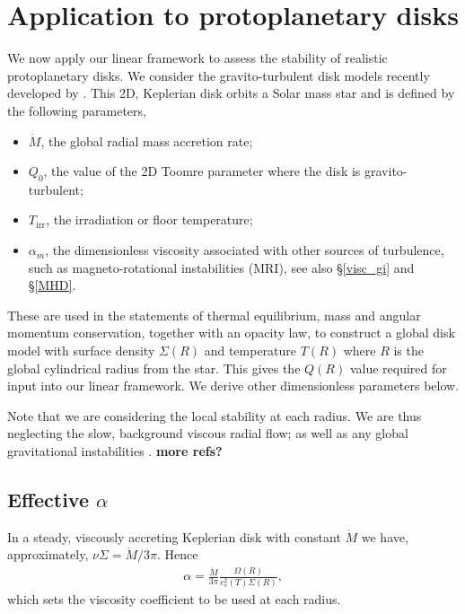 \section{Application to protoplanetary disks}\label{2dppd}
We now apply our linear framework to assess the stability of realistic 
protoplanetary disks. We consider the gravito-turbulent disk models recently
developed by \cite[][hereafter ]{rafikov15}. 
This 2D, Keplerian disk orbits a Solar 
mass star and is defined by the following parameters, 

\begin{itemize}
  \item $\dot{M}$, the global radial mass accretion rate;
  \item $Q_0$, the value of the 2D Toomre parameter where the disk is
    gravito-turbulent;
  \item $T_\mathrm{irr}$, the irradiation or floor temperature;
  \item $\alpha_m$, the dimensionless viscosity associated with other
    sources of turbulence, such as magneto-rotational instabilities
    (MRI), see also \S\ref{visc_gi} and \S\ref{MHD}. 
\end{itemize} 
These are used in the statements of thermal equilibrium, mass and
angular momentum conservation, together with an opacity law, 
to construct a global disk model with surface density $\Sigma(R)$ and
temperature $T(R)$ where $R$ is the global cylindrical radius from the
star.  This gives the $Q(R)$
value required for input into our linear framework. We derive other
dimensionless parameters below. 

Note that we are considering the local stability at each radius. We
are thus neglecting the slow, background viscous radial flow; as well
as any global gravitational instabilities \citep{lodato05}. {\bf more refs?}

\subsection{Effective $\alpha$}
In a steady, viscously accreting Keplerian disk 
with constant $\dot{M}$ we have,
approximately, $\nu\Sigma = \dot{M}/3\pi$. Hence
\begin{align}
  \alpha = \frac{\dot{M}}{3\pi}\frac{\Omega(R)}{c_{s}^2(T)\Sigma(R)},  
\end{align} 
which sets the viscosity coefficient to be used at each radius. 

